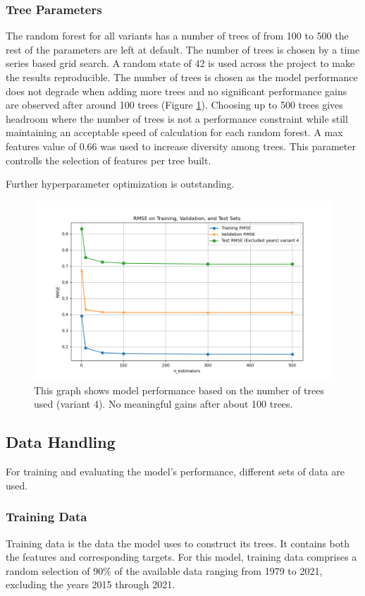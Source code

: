 \documentclass{article}
\begin{document}
\subsubsection{Tree Parameters}
The random forest for all variants has a number of trees of from 100 to 500 the rest of the parameters are left at default. The number of trees is chosen by a time series based grid search.  A random state of 42 is used across the project to make the results reproducible.
The number of trees is chosen as the model performance does not degrade when adding more trees and no significant performance gains are observed after around 100 trees (Figure \ref{fig:n_trees_vs_performance}). Choosing  up to 500 trees gives headroom where the number of trees is not a performance constraint while still maintaining an acceptable speed of calculation for each random forest.
A max features value of 0.66 was used to increase diversity among trees. This parameter controlls the selection of features per tree built.

Further hyperparameter optimization is outstanding.
\begin{figure}[H]
	\centering
	\includegraphics[width=1.0\textwidth]{./plots/n_trees_vs_error_variant_4.png}
	\caption{\label{fig:n_trees_vs_performance}This graph shows model performance based on the number of trees used (variant 4). No meaningful gains after about 100 trees.}
\end{figure}

\subsection{Data Handling}
For training and evaluating the model's performance, different sets of data are used.
\subsubsection{Training Data}
Training data is the data the model uses to construct its trees. It contains both the features and corresponding targets.
For this model, training data comprises a random selection of 90\% of the available data ranging from 1979 to 2021, excluding the years 2015 through 2021.
\end{document}
